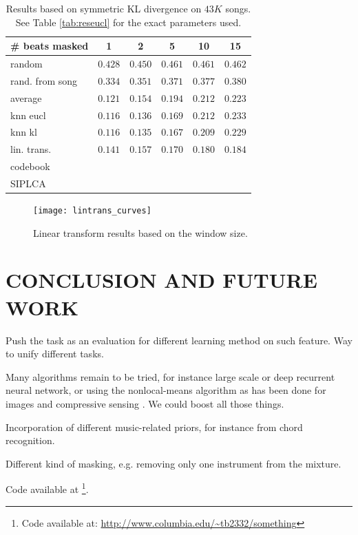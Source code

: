 \documentclass{article}
\begin{document}
\begin{table}[t]
\begin{center}
\begin{tabular}{l|c|c|c|c|c|}
\# beats masked & 1 & 2 & 5 & 10 & 15 \\ \hline \hline
random & $0.428$ & $0.450$ & $0.461$ & $0.461$ & $0.462$  \\
rand. from song & $0.334$ & $0.351$ & $0.371$ & $0.377$ & $0.380$  \\
average & $0.121$ & $0.154$ & $0.194$ & $0.212$ &  $0.223$ \\
knn eucl & $\mathbf{0.116}$ & $0.136$ & $0.169$ & $0.212$ & $0.233$ \\
knn kl & $\mathbf{0.116}$ & $\mathbf{0.135}$ & $\mathbf{0.167}$ & $0.209$ & $0.229$ \\
lin. trans. & $0.141$ & $0.157$ & $0.170$ & $\mathbf{0.180}$ & $\mathbf{0.184}$ \\
codebook & & & & &  \\
SIPLCA & & & & &  \\ \hline
\end{tabular}
\caption{Results based on symmetric KL divergence on $43K$ songs.
See Table \ref{tab:reseucl} for the exact parameters used.}
\label{tab:reskl}
\end{center}
\end{table}

\begin{figure}[t]
\begin{center}
\texttt{[image: lintrans\_curves]}
\end{center}
\caption{Linear transform results based on the window size.}
\label{fig:lintrans}
\end{figure}


\section{CONCLUSION AND FUTURE WORK}
\label{sec:conclusion}
Push the task as an evaluation for different learning method on such feature.
Way to unify different tasks.

Many algorithms remain to be tried, for instance large scale or deep recurrent
neural network, or using the nonlocal-means algorithm as has been done for
images \cite{Buades2005} and compressive sensing \cite{Gemmeke2008}.
We could boost all those things.

Incorporation of different music-related priors, for instance from chord recognition.

Different kind of masking, e.g. removing only one instrument from the mixture.

Code available at \footnote{Code available at: \url{http://www.columbia.edu/~tb2332/something}}.





\end{document}

